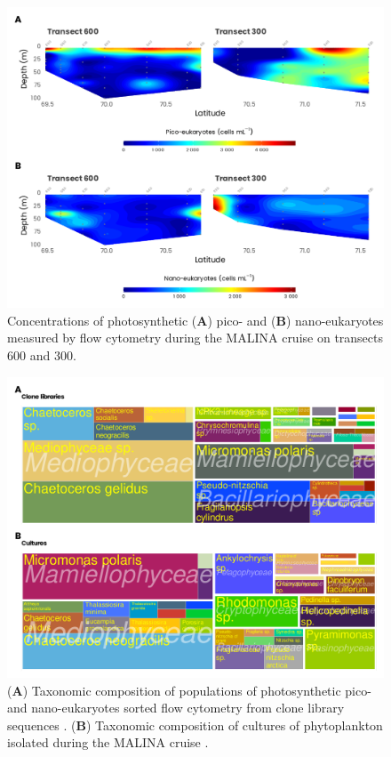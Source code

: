 \documentclass[essd, manuscript]{copernicus}
\begin{document}
\clearpage

\begin{figure}[H]
    \centering
    \includegraphics[scale = 1]{../../../graphs/fig11.pdf}
    \caption{Concentrations of photosynthetic (\textbf{A}) pico- and (\textbf{B}) nano-eukaryotes measured by flow cytometry during the MALINA cruise on transects 600 and 300.}
\end{figure}

\clearpage

\begin{figure}[H]
    \centering
    \includegraphics[scale = 1]{../../../graphs/fig12.pdf}
    \caption{(\textbf{A}) Taxonomic composition of populations of photosynthetic pico- and nano-eukaryotes sorted flow cytometry from clone library sequences  \citep{Balzano2012}. (\textbf{B}) Taxonomic composition of cultures of phytoplankton isolated during the MALINA cruise \citep{Balzano2012}.}
\end{figure}
\end{document}
